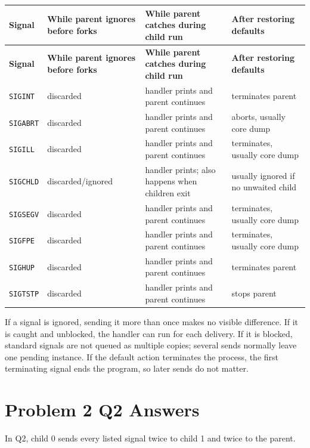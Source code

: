 \documentclass[11pt]{article}
\begin{document}
\begin{longtable}{|p{}|p{}|p{}|p{}|}
\hline
\textbf{Signal} & \textbf{While parent ignores before forks} &
\textbf{While parent catches during child run} & \textbf{After restoring defaults} \\
\hline
\endfirsthead
\hline
\textbf{Signal} & \textbf{While parent ignores before forks} &
\textbf{While parent catches during child run} & \textbf{After restoring defaults} \\
\hline
\endhead
\texttt{SIGINT} & discarded & handler prints and parent continues & terminates parent \\
\hline
\texttt{SIGABRT} & discarded & handler prints and parent continues & aborts, usually core dump \\
\hline
\texttt{SIGILL} & discarded & handler prints and parent continues & terminates, usually core dump \\
\hline
\texttt{SIGCHLD} & discarded/ignored & handler prints; also happens when children exit &
usually ignored if no unwaited child \\
\hline
\texttt{SIGSEGV} & discarded & handler prints and parent continues & terminates, usually core dump \\
\hline
\texttt{SIGFPE} & discarded & handler prints and parent continues & terminates, usually core dump \\
\hline
\texttt{SIGHUP} & discarded & handler prints and parent continues & terminates parent \\
\hline
\texttt{SIGTSTP} & discarded & handler prints and parent continues & stops parent \\
\hline
\end{longtable}

If a signal is ignored, sending it more than once makes no visible difference. If it
is caught and unblocked, the handler can run for each delivery. If it is blocked,
standard signals are not queued as multiple copies; several sends normally leave one
pending instance. If the default action terminates the process, the first
terminating signal ends the program, so later sends do not matter.

\section{Problem 2 Q2 Answers}

In Q2, child 0 sends every listed signal twice to child 1 and twice to the parent.
\end{document}
